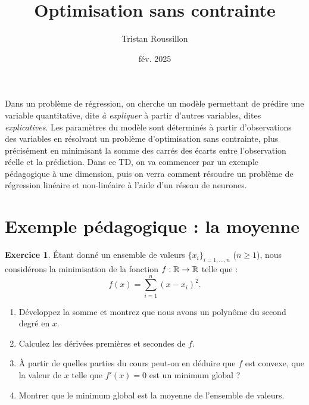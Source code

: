 \documentclass[a4paper,francais]{article}
\title{Optimisation sans contrainte}
\author{Tristan Roussillon}
\date{fév. 2025}
\newcommand{\R}{{\ensuremath\mathbb{R}}}
\theoremstyle{definition}
\newtheorem{exercice}{Exercice}[section]
\begin{document}
\maketitle

Dans un problème de régression, on cherche un modèle permettant de prédire une variable quantitative, dite \emph{à expliquer}
à partir d'autres variables, dites \emph{explicatives}. Les paramètres du modèle sont déterminés à partir d'observations
des variables en résolvant un problème d'optimisation sans contrainte, plus précisément en minimisant la somme des carrés
des écarts entre l'observation réelle et la prédiction. Dans ce TD, on va commencer par un exemple pédagogique à une dimension,
puis on verra comment résoudre un problème de régression linéaire et non-linéaire à l'aide d'un réseau de neurones.

\section{Exemple pédagogique : la moyenne}
\label{sec:moyenne}

\begin{exercice}
  \'Etant donné un ensemble de valeurs $\{x_i\}_{i = 1,\dots,n}$ ($n \geq 1$),
  nous considérons la minimisation de la fonction $f : \R \rightarrow \R$ telle que :
  \[ f(x) = \sum_{i=1}^n (x-x_i)^2. \] 
  
  \begin{enumerate}
  \item Développez la somme et montrez que nous avons un polynôme du second degré en $x$.
  \item Calculez les dérivées premières et secondes de $f$.
  \item \`A partir de quelles parties du cours peut-on en déduire que $f$ est convexe,
    que la valeur de $x$ telle que $f'(x) = 0$ est un minimum global ?
  \item Montrer que le minimum global est la moyenne de l'ensemble de valeurs.
  \end{enumerate}
\end{exercice}
\end{document}
